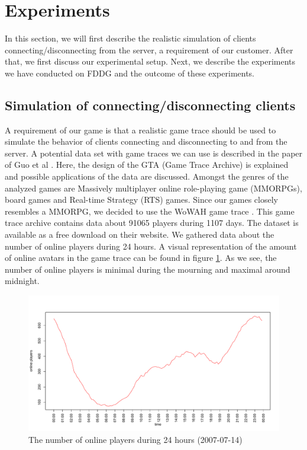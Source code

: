 \section{Experiments}
	In this section, we will first describe the realistic simulation of clients connecting/disconnecting from the server, a requirement of our customer. After that, we first discuss our experimental setup. Next, we describe the experiments we have conducted on FDDG and the outcome of these experiments.
	
\subsection{Simulation of connecting/disconnecting clients}
A requirement of our game is that a realistic game trace should be used to simulate the behavior of clients connecting and disconnecting to and from the server.
A potential data set with game traces we can use is described in the paper of Guo et al \cite{guo2012game}.
Here, the design of the GTA (Game Trace Archive) is explained and possible applications of the data are discussed.
Amongst the genres of the analyzed games are Massively multiplayer online role-playing game (MMORPGs), board games and Real-time Strategy (RTS) games. 
Since our games closely resembles a MMORPG, we decided to use the WoWAH game trace \cite{lee2011world}.
This game trace archive contains data about 91065 players during 1107 days. The dataset is available as a free download on their website.
We gathered data about the number of online players during 24 hours. 
A visual representation of the amount of online avatars in the game trace can be found in figure \ref{fig:online_players_plot}. As we see, the number of online players is minimal during the mourning and maximal around midnight.

\begin{figure}[h!]
  \centering
    \includegraphics[width=\textwidth]{images/online_players_plot}
    
  \caption{The number of online players during 24 hours (2007-07-14)}
  \label{fig:online_players_plot}
\end{figure}

